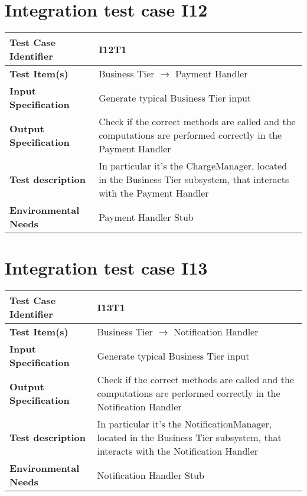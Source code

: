 \section{Integration test case I12}\label{I12}
\begin{center}
	\vspace{0.6cm}
	\begin{tabular}{|l|p{10cm}|}
		\hline
		\textbf{Test Case Identifier} & I12T1 \bigstrut \\\hline
		\textbf{Test Item(s)} & Business Tier \ensuremath{\rightarrow} Payment Handler \bigstrut \\\hline
		\textbf{Input Specification} & Generate typical Business Tier input \bigstrut \\\hline
		\textbf{Output Specification} & Check if the correct methods are called and the computations are performed correctly in the Payment Handler \bigstrut \\\hline
		\textbf{Test description} & In particular it's the ChargeManager, located in the Business Tier subsystem, that interacts with the Payment Handler \bigstrut \\\hline
		\textbf{Environmental Needs} & Payment Handler Stub \bigstrut \\\hline
	\end{tabular}
\end{center}

\section{Integration test case I13}\label{I13}
\begin{center}
	\vspace{0.6cm}
	\begin{tabular}{|l|p{10cm}|}
		\hline
		\textbf{Test Case Identifier} & I13T1 \bigstrut \\\hline
		\textbf{Test Item(s)} & Business Tier \ensuremath{\rightarrow} Notification Handler \bigstrut \\\hline
		\textbf{Input Specification} & Generate typical Business Tier input \bigstrut \\\hline
		\textbf{Output Specification} & Check if the correct methods are called and the computations are performed correctly in the Notification Handler \bigstrut \\\hline
		\textbf{Test description} & In particular it's the NotificationManager, located in the Business Tier subsystem, that interacts with the Notification Handler \bigstrut \\\hline
		\textbf{Environmental Needs} & Notification Handler Stub \bigstrut \\\hline
	\end{tabular}
\end{center}

